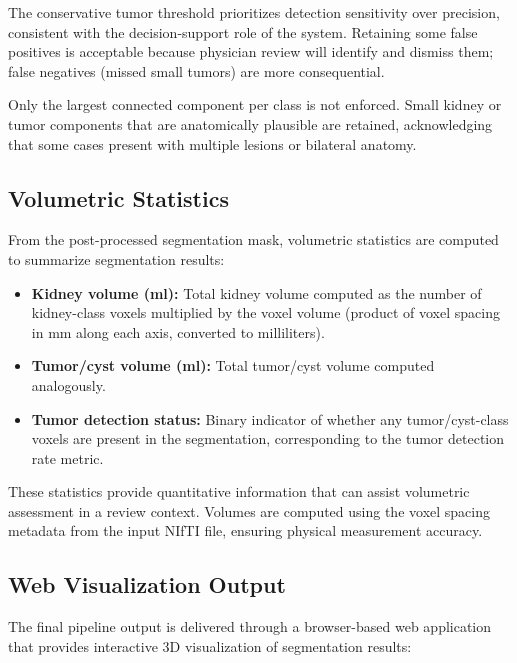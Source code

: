 The conservative tumor threshold prioritizes detection sensitivity over precision, consistent with the decision-support role of the system. Retaining some false positives is acceptable because physician review will identify and dismiss them; false negatives (missed small tumors) are more consequential.

Only the largest connected component per class is not enforced. Small kidney or tumor components that are anatomically plausible are retained, acknowledging that some cases present with multiple lesions or bilateral anatomy.

\subsection{Volumetric Statistics}

From the post-processed segmentation mask, volumetric statistics are computed to summarize segmentation results:

\begin{itemize}
    \item \textbf{Kidney volume (ml):} Total kidney volume computed as the number of kidney-class voxels multiplied by the voxel volume (product of voxel spacing in mm along each axis, converted to milliliters).
    \item \textbf{Tumor/cyst volume (ml):} Total tumor/cyst volume computed analogously.
    \item \textbf{Tumor detection status:} Binary indicator of whether any tumor/cyst-class voxels are present in the segmentation, corresponding to the tumor detection rate metric.
\end{itemize}

These statistics provide quantitative information that can assist volumetric assessment in a review context. Volumes are computed using the voxel spacing metadata from the input NIfTI file, ensuring physical measurement accuracy.

\subsection{Web Visualization Output}

The final pipeline output is delivered through a browser-based web application that provides interactive 3D visualization of segmentation results:

